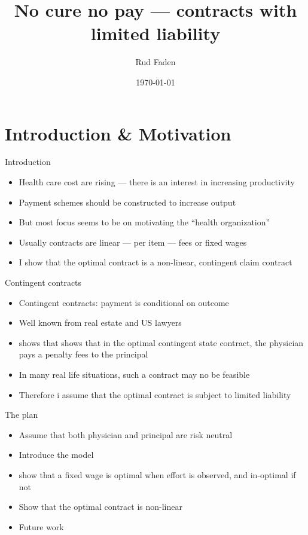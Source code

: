 \documentclass[compress, handout]{beamer}
\title{No cure no pay --- contracts with limited liability}
\subtitle{}
\date{\today}
\author{Rud Faden}
\institute{University of Copenhagen}
\begin{document}
\maketitle

\section*{Introduction \& Motivation}
\begin{frame}{Introduction}
  \begin{itemize}[<+- | alert@+>]
    \item Health care cost are rising --- there is an interest in increasing productivity
    \item Payment schemes should be constructed to increase output
    \item But most focus seems to be on motivating the ``health organization''
    \item Usually contracts are linear --- per item --- fees or fixed wages
    \item I show that the optimal contract is a non-linear, contingent claim contract
  \end{itemize}
\end{frame}

\begin{frame}[c]{Contingent contracts}
 \begin{itemize}[<+- | alert@+>]
   \item Contingent contracts: payment is conditional on outcome
   \item Well known from real estate and US lawyers
   \item \cite{Lambert2005No} shows that shows that in the optimal contingent state contract, the physician pays a penalty fees to the principal
   \item In many real life situations, such a contract may no be feasible
   \item Therefore i assume that the optimal contract is subject to limited liability
 \end{itemize}
\end{frame}


\begin{frame}[c]{The plan}
  \begin{itemize}[<+- | alert@+>]
      \item Assume that both physician and principal are risk neutral
      \item Introduce the model
      \item show that a fixed wage is optimal when effort is observed, and in-optimal if not
      \item Show that the optimal contract is non-linear
      \item Future work
    \end{itemize}  
\end{frame}
\end{document}

